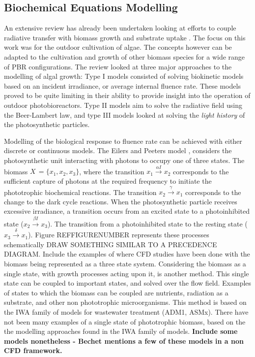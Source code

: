 \subsection{Biochemical Equations Modelling}
\label{S:3.3}
An extensive review has already been undertaken looking at efforts to couple radiative transfer with biomass growth and substrate uptake \cite{Bechet2013}. The focus on this work was for the outdoor cultivation of algae. The concepts however can be adapted to the cultivation and growth of other biomass species for a wide range of PBR configurations. The review looked at three major approaches to the modelling of algal growth: Type I models consisted of solving biokinetic models based on an incident irradiance, or average internal fluence rate. These models proved to be quite limiting in their ability to provide insight into the operation of outdoor photobioreactors. Type II models aim to solve the radiative field using the Beer-Lambert law, and type III models looked at solving the \textit{light history} of the photosynthetic particles.

\skippingparagraph
Modelling of the biological response to fluence rate can be achieved with either discrete or continuous models. The Eilers and Peeters model \cite{Eilers1988}, considers the photosynthetic unit interacting with photons to occupy one of three states. The biomass $X \,= \{x_1, x_2, x_3\}$, where the transition $x_1 \xrightarrow{\alpha I} x_2$ corresponds to the sufficient capture of photons at the required frequency to initiate the phototrophic biochemical reactions. The transition $x_2 \xrightarrow{\gamma} x_1$ corresponds to the change to the dark cycle reactions. When the photosynthetic particle receives excessive irradiance, a transition occurs from an excited state to a photoinhibited state ($x_2 \xrightarrow{\beta I} x_3$). The transition from a photoinhibited state to the resting state ($x_3 \xrightarrow{\delta} x_1$). Figure REFFIGURENUMBER represents these processes schematically DRAW SOMETHING SIMILAR TO A PRECEDENCE DIAGRAM. Include the examples of where CFD studies have been done with the biomass being represented as a three state system.
\skippingparagraph
Considering the biomass as a single state, with growth processes acting upon it, is another method. This single state can be coupled to important states, and solved over the flow field. Examples of states to which the biomass can be coupled are nutrients, radiation as a substrate, and other non phototrophic microorganisms. This method is based on the IWA family of models for wastewater treatment (ADM1, ASMx). There have not been many examples of a single state of phototrophic biomass, based on the the modelling approaches found in the IWA family of models. \textbf{Include some models nonetheless - Bechet mentions a few of these models in a non CFD framework.}

